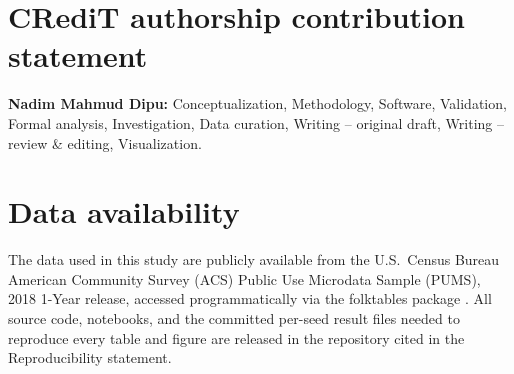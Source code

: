 \documentclass[review,12pt]{elsarticle}
\begin{document}
\section*{CRediT authorship contribution statement}
\textbf{Nadim Mahmud Dipu:} Conceptualization, Methodology, Software, Validation, Formal analysis, Investigation, Data curation, Writing -- original draft, Writing -- review \& editing, Visualization.

\section*{Data availability}
The data used in this study are publicly available from the U.S.\ Census Bureau American Community Survey (ACS) Public Use Microdata Sample (PUMS), 2018 1-Year release, accessed programmatically via the folktables package \cite{ding2021}. All source code, notebooks, and the committed per-seed result files needed to reproduce every table and figure are released in the repository cited in the Reproducibility statement.



\end{document}
